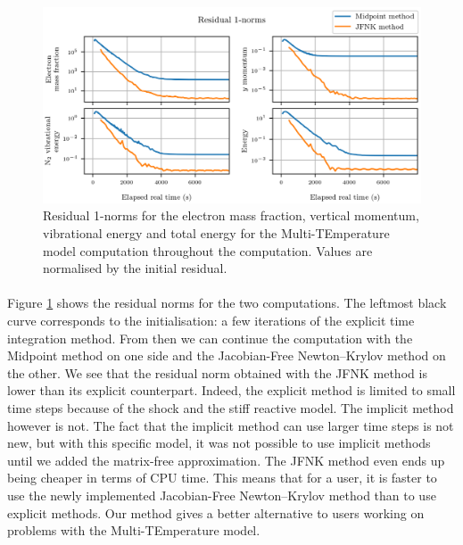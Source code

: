         \begin{figure}
          \centering
          \includegraphics{figures/sphere_mte_residuals.png}
          \caption{Residual 1-norms for the electron mass fraction, vertical momentum,  vibrational energy and total energy for the Multi-TEmperature model computation throughout the computation.
          Values are normalised by the initial residual.}
          \label{fig:sphere_mte_residuals}
        \end{figure}

        \paragraph{}
        Figure \ref{fig:sphere_mte_residuals} shows the residual norms for the two computations.
        The leftmost black curve corresponds to the initialisation: a few iterations of the explicit time integration method.
        From then we can continue the computation with the Midpoint method on one side and the Jacobian-Free Newton--Krylov method on the other.
        We see that the residual norm obtained with the JFNK method is lower than its explicit counterpart.
        Indeed, the explicit method is limited to small time steps because of the shock and the stiff reactive model.
        The implicit method however is not.
        The fact that the implicit method can use larger time steps is not new, but with this specific model, it was not possible to use implicit methods until we added the matrix-free approximation.
        The JFNK method even ends up being cheaper in terms of CPU time.
        This means that for a user, it is faster to use the newly implemented Jacobian-Free Newton--Krylov method than to use explicit methods.
        Our method gives a better alternative to users working on problems with the Multi-TEmperature model.


